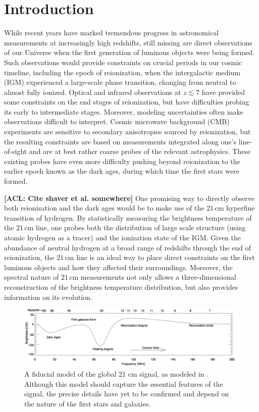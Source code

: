 \documentclass[twolcolumn,apj,iop,numberedappendix]{emulateapj}
\newcommand{\acl}[1]{{\color{red} \textbf{[ACL:  #1]}}}
\begin{document}

\section{Introduction}

While recent years have marked tremendous progress in astronomical measurements at increasingly high redshifts, still missing are direct observations of our Universe when the first generation of luminous objects were being formed. Such observations would provide constraints on crucial periods in our cosmic timeline, including the epoch of reionization, when the intergalactic medium (IGM) experienced a large-scale phase transition, changing from neutral to almost fully ionized. Optical and infrared observations at $z \lesssim 7$ have provided some constraints on the end stages of reionization, but have difficulties probing its early to intermediate stages. Moreover, modeling uncertainties often make observations difficult to interpret. Cosmic microwave background (CMB) experiments are sensitive to secondary anisotropies sourced by reionization, but the resulting constraints are based on measurements integrated along one's line-of-sight and are at best rather coarse probes of the relevant astrophysics. These existing probes have even more difficulty pushing beyond reionization to the earlier epoch known as the dark ages, during which time the first stars were formed.

\acl{Cite shaver et al. somewhere}
One promising way to directly observe both reionization and the dark ages would be to make use of the $21\,\textrm{cm}$ hyperfine transition of hydrogen. By statistically measuring the brightness temperature of the $21\,\textrm{cm}$ line, one probes both the distribution of large scale structure (using atomic hydrogen as a tracer) and the ionization state of the IGM. Given the abundance of neutral hydrogen at a broad range of redshifts through the end of reionization, the $21\,\textrm{cm}$ line is an ideal way to place direct constraints on the first luminous objects and how they affected their surroundings. Moreover, the spectral nature of $21\,\textrm{cm}$ measurements not only allows a three-dimensional reconstruction of the brightness temperature distribution, but also provides information on its evolution.


\begin{figure}[!]
	\centering
	\includegraphics[width=1.00\textwidth]{figures/fidModel.png}
	\caption{A fiducial model of the global 21 cm signal, as modeled in \citet{PritchardLoeb2010}. Although this model should capture the essential features of the signal, the precise details have yet to be confirmed and depend on the nature of the first stars and galaxies.}
	\label{fig:21cmSignal}
\end{figure}
\end{document}
